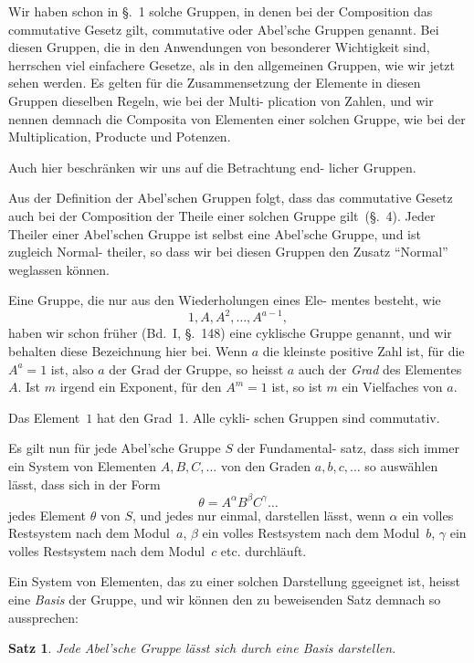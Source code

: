 \documentclass[12pt,a4paper]{article}
\theoremstyle{plain}
\newtheorem{satz}{Satz}[section]
\theoremstyle{definition}
\theoremstyle{remark}
\begin{document}
Wir haben schon in \S.~1 solche Gruppen, in denen bei
der Composition das commutative Gesetz gilt, commutative oder
Abel'sche Gruppen genannt. Bei diesen Gruppen, die in den
Anwendungen von besonderer Wichtigkeit sind, herrschen viel
einfachere Gesetze, als in den allgemeinen Gruppen, wie wir
jetzt sehen werden. Es gelten für die Zusammensetzung der
Elemente in diesen Gruppen dieselben Regeln, wie bei der Multi-
plication von Zahlen, und wir nennen demnach die Composita
von Elementen einer solchen Gruppe, wie bei der Multiplication,
Producte und Potenzen.

Auch hier beschränken wir uns auf die Betrachtung end-
licher Gruppen.

Aus der Definition der Abel'schen Gruppen folgt, dass das
commutative Gesetz auch bei der Composition der Theile einer
solchen Gruppe gilt~(\S.~4). Jeder Theiler einer Abel'schen
Gruppe ist selbst eine Abel'sche Gruppe, und ist zugleich Normal-
theiler, so dass wir bei diesen Gruppen den Zusatz ``Normal''
weglassen können.

Eine Gruppe, die nur aus den Wiederholungen eines Ele-
mentes besteht, wie
\[
1, A, A^2, \ldots, A^{a-1},
\]
haben wir schon früher (Bd.~I, \S.~148) eine cyklische Gruppe
genannt, und wir behalten diese Bezeichnung hier bei. Wenn $a$
die kleinste positive Zahl ist, für die $A^a = 1$ ist, also $a$ der
Grad der Gruppe, so heisst $a$ auch der \emph{Grad} des Elementes $A$.
Ist $m$ irgend ein Exponent, für den $A^m = 1$ ist, so ist $m$ ein
Vielfaches von $a$.

Das Element~$1$ hat den Grad~1. Alle cykli-
schen Gruppen sind commutativ.

Es gilt nun für jede Abel'sche Gruppe $S$ der Fundamental-
satz, dass sich immer ein System von Elementen $A, B, C, \ldots$ von
den Graden $a, b, c, \ldots$ so auswählen lässt, dass sich in der Form
\[
\theta = A^\alpha B^\beta C^\gamma \ldots
\]
jedes Element $\theta$ von $S$, und jedes nur einmal, darstellen lässt,
wenn $\alpha$ ein volles Restsystem nach dem Modul~$a$, $\beta$ ein volles
Restsystem nach dem Modul~$b$, $\gamma$ ein volles Restsystem nach
dem Modul~$c$ etc. durchläuft.

Ein System von Elementen, das zu einer solchen Darstellung
ggeeignet ist, heisst eine \emph{Basis} der Gruppe, und wir können
den zu beweisenden Satz demnach so aussprechen:

\begin{satz} %
Jede Abel'sche Gruppe lässt sich durch eine
Basis darstellen.
\end{satz}
\end{document}
